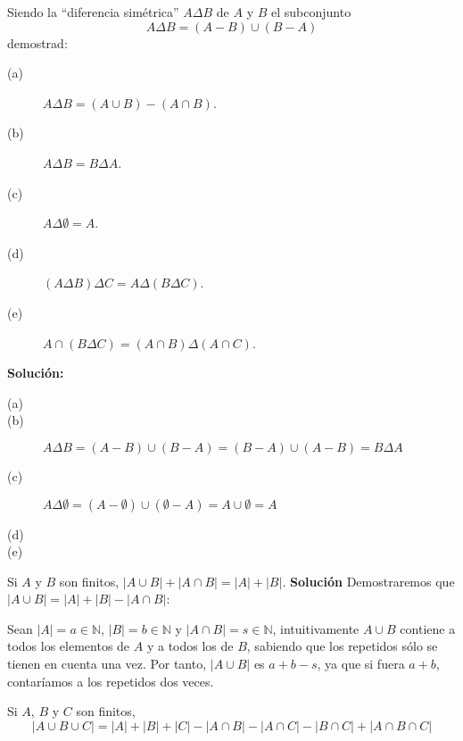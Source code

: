 \begin{ejercicio}
    Siendo la ``diferencia simétrica'' $A\Delta B$ de $A$ y $B$ el subconjunto
    \begin{equation*}
        A\Delta B = (A-B)\cup (B-A)
    \end{equation*}
    demostrad:
    \begin{description}
        \item [(a)] $A\Delta B = (A\cup B) - (A \cap B)$.
        \item [(b)] $A\Delta B = B\Delta A$.
        \item [(c)] $A\Delta \emptyset = A$.
        \item [(d)] $(A\Delta B)\Delta C = A\Delta(B\Delta C)$.
        \item [(e)] $A\cap (B\Delta C) = (A\cap B)\Delta (A\cap C)$.
    \end{description}
    \textbf{Solución:}
    \begin{description}
        \item [(a)] 
        \item [(b)] $A\Delta B = (A-B)\cup (B-A) = (B-A)\cup (A-B) = B\Delta A$
        \item [(c)] $A\Delta \emptyset =(A-\emptyset )\cup(\emptyset -A)=A\cup\emptyset =A$
        \item [(d)] %
        \item [(e)] 
    \end{description}
\end{ejercicio}

\begin{ejercicio}
    Si $A$ y $B$ son finitos, $|A\cup B| + |A\cap B| = |A| + |B|$.\newline
    \textbf{Solución}
    Demostraremos que $|A\cup B| = |A| + |B| - |A\cap B| $:
    
    Sean $|A| = a\in \mathbb{N}$, $|B|=b\in \mathbb{N}$ y $|A\cap B|=s\in \mathbb{N}$, intuitivamente $A\cup B$ contiene a todos los elementos de $A$ y a todos los de $B$, sabiendo que los repetidos sólo se tienen en cuenta una vez. Por tanto, $|A\cup B|$ es $a+b-s$, ya que si fuera $a+b$, contaríamos a los repetidos dos veces.
\end{ejercicio}

\begin{ejercicio}
    Si $A$, $B$ y $C$ son finitos,
    \begin{equation*}
        |A\cup B \cup C| = |A| + |B| + |C| - |A\cap B| - |A\cap C| - |B\cap C| + |A\cap B\cap C|
    \end{equation*}
\end{ejercicio}

